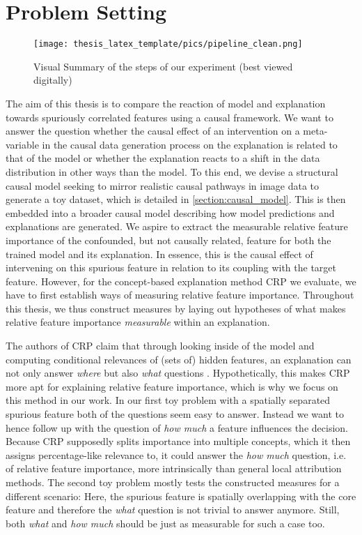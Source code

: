 \chapter{Problem Setting}\label{chapter:problem_setting}

\begin{figure}[h!]
    \texttt{[image: thesis\_latex\_template/pics/pipeline\_clean.png]}%
    \caption[Pipeline]{Visual Summary of the steps of our experiment (best viewed digitally)}
    \label{fig:pipeline}
\end{figure}

The aim of this thesis is to compare the reaction of model and explanation towards spuriously correlated features using a causal framework.
We want to answer the question whether the causal effect of an intervention on a meta-variable in the causal data generation process on the explanation is related to that of the model or whether the explanation reacts to a shift in the data distribution in other ways than the model. 
To this end, we devise a structural causal model seeking to mirror realistic causal pathways in image data to generate a toy dataset, which is detailed in \autoref{section:causal_model}. This is then embedded into a broader causal model describing how model predictions and explanations are generated.
We aspire to extract the measurable relative feature importance of the confounded, but not causally related, feature for both the trained model and its explanation. In essence, this is the causal effect of intervening on this spurious feature in relation to its coupling with the target feature. However, for the concept-based explanation method CRP we evaluate, we have to first establish ways of measuring relative feature importance. 
Throughout this thesis, we thus construct measures by laying out hypotheses of what makes relative feature importance \textit{measurable} within an explanation.

The authors of CRP claim that through looking inside of the model and computing conditional relevances of (sets of) hidden features, an explanation can not only answer \textit{where} but also \textit{what} questions \citep{Achtibat2022}. Hypothetically, this makes CRP more apt for explaining relative feature importance, which is why we focus on this method in our work.
In our first toy problem with a spatially separated spurious feature both of the questions seem easy to answer. Instead we want to hence follow up with the question of \textit{how much} a feature influences the decision. Because CRP supposedly splits importance into multiple concepts, which it then assigns percentage-like relevance to, it could answer the \textit{how much} question, i.e. of relative feature importance, more intrinsically than general local attribution methods. The second toy problem mostly tests the constructed measures for a different scenario: Here, the spurious feature is spatially overlapping with the core feature and therefore the \textit{what} question is not trivial to answer anymore. Still, both \textit{what} and \textit{how much} should be just as measurable for such a case too.

